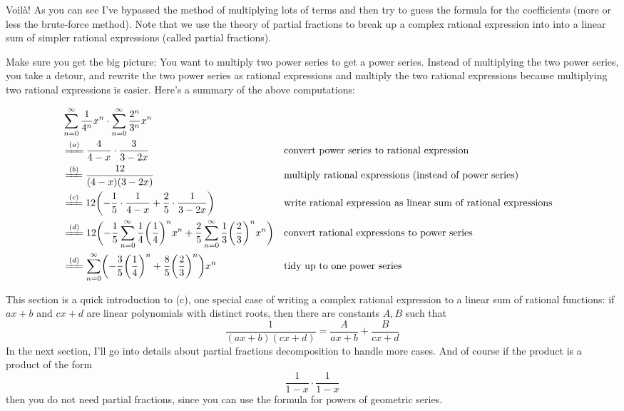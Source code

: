Voil\`a!
As you can see I've bypassed the 
method of multiplying lots of terms and then try to guess
the formula for the coefficients (more or less the brute-force
method).
Note that we use the theory of partial fractions to 
break up a complex rational expression into
into a linear sum of simpler rational expressions (called partial fractions).

Make sure you get the big picture:
You want to multiply two power series to get a power series.
Instead of multiplying the two power series, you take a detour,
and rewrite the two power series as rational expressions
and multiply the two rational expressions because
multiplying two rational expressions is easier.
Here's a summary of the above computations:

\newcommand\tmpAA{\sum_{n=0}^\infty \frac{1}{4^n} x^n \cdot \sum_{n=0}^\infty \frac{2^n}{3^n} x^n }
\newcommand\tmpBB{\frac{4}{4 - x} \cdot  \frac{3}{3 - 2x}}
\newcommand\tmpCC{\frac{12}{(4-x)(3-2x)}}
\newcommand\tmpDD{12 \biggl( -\frac{1}{5} \cdot \frac{1}{4-x} + \frac{2}{5}\cdot \frac{1}{3-2x} \biggr)}
\newcommand\tmpEE{12 \biggl( 
-\frac{1}{5}  \sum_{n=0}^\infty \frac{1}{4} \biggl( \frac{1}{4} \biggr)^n x^n +
\frac{2}{5}  \sum_{n=0}^\infty \frac{1}{3} \biggl( \frac{2}{3} \biggr)^n x^n
\biggr) 
}
\newcommand\tmpFF{
\sum_{n=0}^\infty 
\biggl( 
-\frac{3}{5} \biggl( \frac{1}{4} \biggr)^n +
\frac{8}{5} \biggl( \frac{2}{3} \biggr)^n
\biggr) x^n
}

{\footnotesize
\begin{align*}
&\tmpAA \\ 
&\xlongequal{(a)} \tmpBB & & \text{convert power series to rational expression} \\
&\xlongequal{(b)} \tmpCC & & \text{multiply rational expressions (instead of power series)}\\
&\xlongequal{(c)} \tmpDD & & \text{write rational expression as linear sum of rational expressions}\\
&\xlongequal{(d)} \tmpEE & & \text{convert rational expressions to power series} \\
&\xlongequal{(d)} \tmpFF & & \text{tidy up to one power series}
\end{align*}
}

This section is a quick introduction to (c), one special case of
writing a complex rational expression to a linear sum of
rational functions:
if $ax + b$ and $cx + d$ are linear polynomials with distinct roots,
then there are constants $A, B$ such that
\[
\frac{1}{(ax + b)(cx + d)} = \frac{A}{ax + b} + \frac{B}{cx + d}
\]
In the next section, I'll go into details about
partial fractions decomposition to handle more cases.
And of course if the product is a product of the form
\[
\frac{1}{1 - x}
\cdot
\frac{1}{1 - x}
\]
then you do not need partial fractions, since you can
use the formula for powers of geometric series.


\newpage
